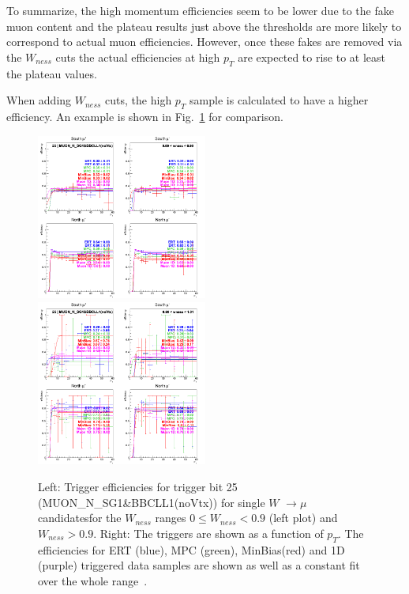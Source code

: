 To summarize, the high momentum efficiencies seem to be lower due to the fake
muon content and the plateau results just above the thresholds are more likely
to correspond to actual muon efficiencies. However, once these fakes are removed
via the $W_{ness}$ cuts the actual efficiencies at high $p_T$
are expected to rise to at least the plateau values.  

When adding $W_{ness}$ cuts, the high $p_T$ sample is calculated to have a
higher efficiency. An example is shown in
Fig.~\ref{fig:run13_trigeffiptlowhighpt} for comparison.

\begin{figure}[ht]
  \centering
  \includegraphics[width=0.5\textwidth]{./figures/run13_trigeffipt_iw0_trig25_lin.png}
  \includegraphics[width=0.5\textwidth]{./figures/run13_trigeffipt_iw1_trig25_lin.png}
  \caption{
    Left: Trigger efficiencies for trigger bit 25 (MUON\_N\_SG1\&BBCLL1(noVtx))
    for single $W$ $\rightarrow \mu$ candidatesfor the $W_{ness}$ ranges  $ 0
    \leq W_{ness} < 0.9 $ (left plot) and $W_{ness} > 0.9$. Right: The triggers
    are shown as a function of $p_T$. The efficiencies for ERT
    (blue), MPC (green), MinBias(red) and 1D (purple) triggered data samples are
    shown as well as a constant fit over the whole range~\cite{Seild2014}.
  }
  \label{fig:run13_trigeffiptlowhighpt} 
\end{figure}

